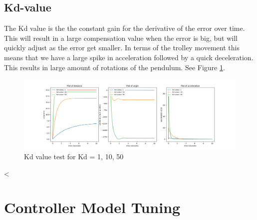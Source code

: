 \documentclass{article}
\begin{document}
\subsection{Kd-value}
The Kd value is the the constant gain for the derivative of the error over time. This will result in a large compensation value when the error is big, but will quickly adjust as the error get smaller. In terms of the trolley movement this means that we have a large spike in acceleration followed by a quick deceleration. This results in large amount of rotations of the pendulum. See Figure \ref{fig:kd-test}.
\begin{figure}[h]
    \centering
    \includegraphics[width=1\linewidth]{graphs/kd_test.png}
    \caption{Kd value test for Kd = 1, 10, 50}
    \label{fig:kd-test}
\end{figure}
<
\section{Controller Model Tuning}
\end{document}
